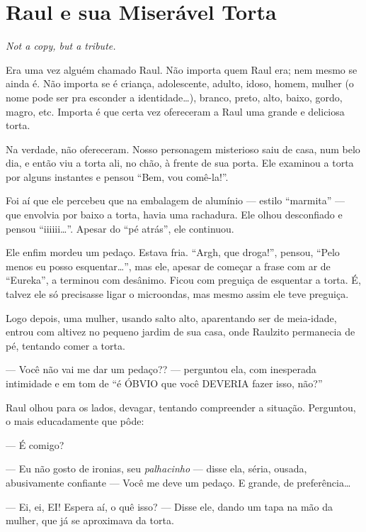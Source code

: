 \chapter{Raul e sua Miserável Torta}

\begin{flushright}
\emph{Not a copy, but a tribute.}
\end{flushright}

Era uma vez alguém chamado Raul. Não importa quem Raul era; nem mesmo se ainda é. Não importa se é criança, adolescente, adulto, idoso, homem, mulher (o nome pode ser pra esconder a identidade\ldots), branco, preto, alto, baixo, gordo, magro, etc. Importa é que certa vez ofereceram a Raul uma grande e deliciosa torta.

Na verdade, não ofereceram. Nosso personagem misterioso saiu de casa, num belo dia, e então viu a torta ali, no chão, à frente de sua porta. Ele examinou a torta por alguns instantes e pensou ``Bem, vou comê-la!''.

Foi aí que ele percebeu que na embalagem de alumínio --- estilo ``marmita'' --- que envolvia por baixo a torta, havia uma rachadura. Ele olhou desconfiado e pensou ``iiiiii\ldots''. Apesar do ``pé atrás'', ele continuou.

Ele enfim mordeu um pedaço. Estava fria. ``Argh, que droga!'', pensou, ``Pelo menos eu posso esquentar\ldots'', mas ele, apesar de começar a frase com ar de ``Eureka'', a terminou com desânimo. Ficou com preguiça de esquentar a torta. É, talvez ele só precisasse ligar o microondas, mas mesmo assim ele teve preguiça.

Logo depois, uma mulher, usando salto alto, aparentando ser de meia-idade, entrou com altivez no pequeno jardim de sua casa, onde Raulzito permanecia de pé, tentando comer a torta.

--- Você não vai me dar um pedaço?? --- perguntou ela, com inesperada intimidade e em tom de ``é ÓBVIO que você DEVERIA fazer isso, não?''

Raul olhou para os lados, devagar, tentando compreender a situação. Perguntou, o mais educadamente que pôde:

--- É comigo?

--- Eu não gosto de ironias, seu \emph{palhacinho} --- disse ela, séria, ousada, abusivamente confiante --- Você me deve um pedaço. E grande, de preferência\ldots

--- Ei, ei, EI! Espera aí, o quê isso? --- Disse ele, dando um tapa na mão da mulher, que já se aproximava da torta.

